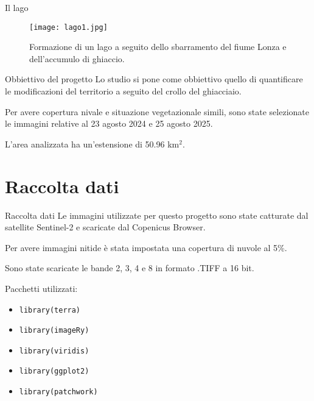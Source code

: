 \documentclass{beamer} %
\begin{document}
\begin{frame}{Il lago}
    \begin{figure}
        \centering
        \texttt{[image: lago1.jpg]}
        \caption{Formazione di un lago a seguito dello sbarramento del fiume Lonza e dell'accumulo di ghiaccio.}
        \label{fig:placeholder}
    \end{figure}
\end{frame}

\begin{frame}{Obbiettivo del progetto}
Lo studio si pone come obbiettivo quello di quantificare le modificazioni del territorio a seguito del crollo del ghiacciaio.


\bigskip Per avere copertura nivale e situazione vegetazionale simili, sono state selezionate le immagini relative al 23 agosto 2024 e 25 agosto 2025.

\bigskip L'area analizzata ha un'estensione di 50.96 km$^{2}$.
    
\end{frame}


\section{Raccolta dati}
 \begin{frame}{Raccolta dati}
        Le immagini utilizzate per questo progetto sono state catturate dal satellite Sentinel-2 e scaricate dal Copenicus Browser.

        \bigskip Per avere immagini nitide è stata impostata una copertura di nuvole al 5\%.
            
        Sono state scaricate le bande 2, 3, 4 e 8 in formato .TIFF a 16 bit.

        \bigskip Pacchetti utilizzati:
        \begin{itemize}
            \item    \texttt{library(terra)} %
            \item    \texttt{library(imageRy)} 
            \item    \texttt{library(viridis)}
            \item    \texttt{library(ggplot2)} 
            \item    \texttt{library(patchwork)}
        \end{itemize}    
        
\end{frame}
\end{document}
